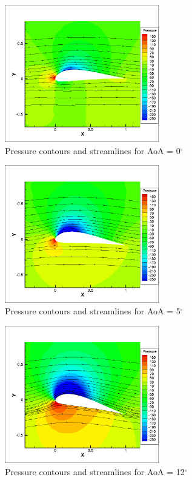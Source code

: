 \begin{figure}[H]
	\centering
	\includegraphics[width=0.6\textwidth]{tecplot_stuff/cont_stream_0.png}
	\caption{Pressure contours and streamlines for AoA = 0$^\circ$}
\label{fig:cont_stream_0}
\end{figure}


\begin{figure}[H]
	\centering
	\includegraphics[width=0.6\textwidth]{tecplot_stuff/cont_stream_5.png}
	\caption{Pressure contours and streamlines for AoA = 5$^\circ$}
\label{fig:cont_stream_5}
\end{figure}


\begin{figure}[H]
	\centering
	\includegraphics[width=0.6\textwidth]{tecplot_stuff/cont_stream_12.png}
	\caption{Pressure contours and streamlines for AoA = 12$^\circ$}
\label{fig:cont_stream_12}
\end{figure}

